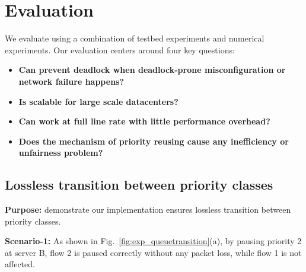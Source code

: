 \section{Evaluation}\label{sec:eval}

We evaluate \sysname{} using a combination of testbed experiments and numerical experiments. Our evaluation centers around four key questions:

\begin{itemize}
	\item \textbf{Can \sysname{} prevent deadlock when deadlock-prone misconfiguration or network failure happens?}
	
	\item \textbf{Is \sysname{} scalable for large scale datacenters?}
	
	\item \textbf{Can \sysname{} work at full line rate with little performance overhead?}
	
	\item \textbf{Does the mechanism of priority reusing cause any inefficiency or unfairness problem?} 
	
\end{itemize}


\subsection{Lossless transition between priority classes}\label{subsec:exp_losslesstransition}

%	
%	
%
%	

\textbf{Purpose:} demonstrate our implementation ensures lossless transition between priority classes.

\textbf{Scenario-1:} As shown in Fig.~\ref{fig:exp_queuetransition}(a), by pausing priority 2 at server B, flow 2 is paused correctly without any packet loss, while flow 1 is not affected.

